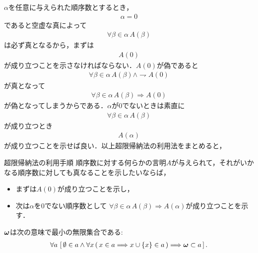 	$\alpha$を任意に与えられた順序数とするとき，
	\begin{align}
		\alpha = 0
	\end{align}
	であると空虚な真によって
	\begin{align}
		\forall \beta \in \alpha\, A(\beta)
	\end{align}
	は必ず真となるから，まずは
	\begin{align}
		A(0)
	\end{align}
	が成り立つことを示さなければならない．$A(0)$が偽であると
	\begin{align}
		\forall \beta \in \alpha\, A(\beta) \wedge \rightharpoondown A(0)
	\end{align}
	が真となって
	\begin{align}
		\forall \beta \in \alpha\, A(\beta) \Longrightarrow A(0)
	\end{align}
	が偽となってしまうからである．$\alpha$が$0$でないときは素直に
	\begin{align}
		\forall \beta \in \alpha\, A(\beta)
	\end{align}
	が成り立つとき
	\begin{align}
		A(\alpha)
	\end{align}
	が成り立つことを示せば良い．以上超限帰納法の利用法をまとめると，
	
	\begin{itembox}[l]{超限帰納法の利用手順}
		順序数に対する何らかの言明$A$が与えられて，それがいかなる順序数に対しても真なることを示したいならば，
		\begin{itemize}
			\item まずは$A(0)$が成り立つことを示し，
			\item 次は$\alpha$を$0$でない順序数として
				$\forall \beta \in \alpha\, A(\beta) \Longrightarrow A(\alpha)$が成り立つことを示す．
		\end{itemize}
	\end{itembox}
	
	\begin{screen}
		\begin{thm}[数学的帰納法の原理]
		\label{thm:the_principle_of_mathematical_induction}
			${\boldsymbol \omega}$は次の意味で最小の無限集合である:
			\begin{align}
				\forall a\, \left[\, \emptyset \in a \wedge \forall x\, 
				(\, x \in a \Longrightarrow x \cup \{x\} \in a\, ) 
				\Longrightarrow {\boldsymbol \omega} \subset a\, \right].
			\end{align}
		\end{thm}
	\end{screen}
	

